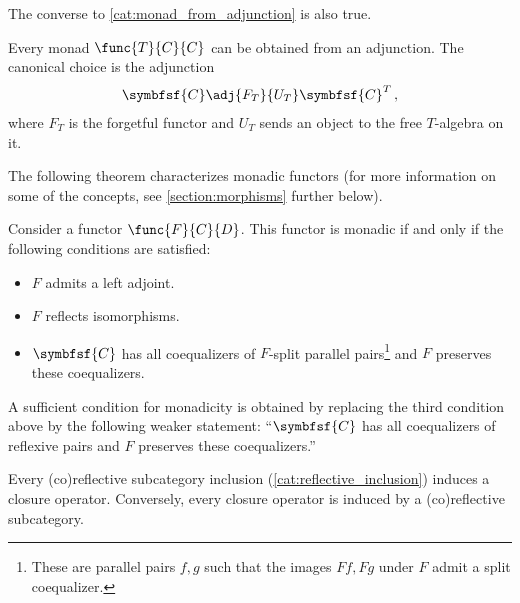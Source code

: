     The converse to \ref{cat:monad_from_adjunction} is also true.
    \begin{property}
        Every monad $\func{T}{C}{C}$ can be obtained from an adjunction. The canonical choice is the adjunction
        \begin{gather}
            \symbfsf{C}\adj{F_T}{U_T}\symbfsf{C}^T\,,
        \end{gather}
        where $F_T$ is the forgetful functor and $U_T$ sends an object to the free $T$-algebra on it.
    \end{property}

    The following theorem characterizes monadic functors (for more information on some of the concepts, see \cref{section:morphisms} further below).
    \begin{theorem}
        Consider a functor $\func{F}{C}{D}$. This functor is monadic if and only if the following conditions are satisfied:
        \begin{itemize}
            \item $F$ admits a left adjoint.
            \item $F$ reflects isomorphisms.
            \item $\symbfsf{C}$ has all coequalizers of $F$-split parallel pairs\footnote{These are parallel pairs $f,g$ such that the images $Ff,Fg$ under $F$ admit a split coequalizer.} and $F$ preserves these coequalizers.
        \end{itemize}
    \end{theorem}
    \begin{remark}
        A sufficient condition for monadicity is obtained by replacing the third condition above by the following weaker statement: ``$\symbfsf{C}$ has all coequalizers of reflexive pairs and $F$ preserves these coequalizers.''
    \end{remark}

    \begin{property}
        Every (co)reflective subcategory inclusion (\cref{cat:reflective_inclusion}) induces a closure operator. Conversely, every closure operator is induced by a (co)reflective subcategory.
    \end{property}

